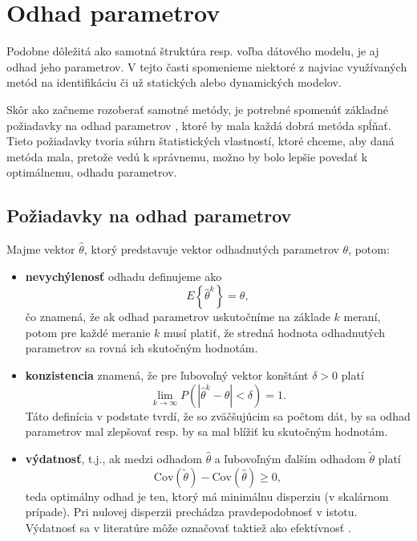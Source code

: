 \section{Odhad parametrov}
Podobne dôležitá ako samotná štruktúra resp. voľba dátového modelu, je aj odhad jeho parametrov. V tejto časti spomenieme niektoré z najviac využívaných metód na identifikáciu či už statických alebo dynamických modelov. 

Skôr ako začneme rozoberať samotné metódy, je potrebné spomenúť základné požiadavky na odhad parametrov \cite{beck:param_est:1977}, ktoré by mala každá dobrá metóda spĺňať. Tieto požiadavky tvoria súhrn štatistických vlastností, ktoré chceme, aby daná metóda mala, pretože vedú k správnemu, možno by bolo lepšie povedať k optimálnemu, odhadu parametrov.

\subsection{Požiadavky na odhad parametrov}
Majme vektor $ \hat{\theta} $, ktorý predstavuje vektor odhadnutých parametrov $ \theta $, potom:
\begin{itemize}
	\item[] \textbf{nevychýlenosť} odhadu definujeme ako
	\begin{equation*}
		E\left\lbrace \hat{\theta}^k \right\rbrace = \theta, 
	\end{equation*}
	čo znamená, že ak odhad parametrov uskutočníme na základe $ k $ meraní, potom pre každé meranie $ k $ musí platiť, že stredná hodnota odhadnutých parametrov sa rovná ich skutočným hodnotám.
	\item[] \textbf{konzistencia} znamená, že pre ľubovoľný vektor konštánt $ \delta > 0 $ platí
	\begin{equation*}
		\lim\limits_{k \rightarrow \infty} P \left( \left| \hat{\theta}^k - \theta \right| < \delta \right) = 1. 
	\end{equation*}
	Táto definícia v podstate tvrdí, že so zväčšujúcim sa počtom dát, by sa odhad parametrov mal zlepšovať resp. by sa mal blížiť ku skutočným hodnotám.
	\item[] \textbf{výdatnosť}, t.j., ak medzi odhadom $ \hat{\theta} $ a ľubovoľným ďalším odhadom $ \tilde{\theta} $ platí 
	\begin{equation*}
		\text{Cov} \left( \tilde{\theta} \right) - \text{Cov} \left( \hat{\theta} \right) \geq 0,
	\end{equation*}
	teda optimálny odhad je ten, ktorý má minimálnu disperziu (v skalárnom prípade). Pri nulovej disperzii prechádza pravdepodobnosť v istotu. Výdatnosť sa v literatúre môže označovať taktiež ako efektívnosť \citealp*{beck:param_est:1977}.
\end{itemize}

